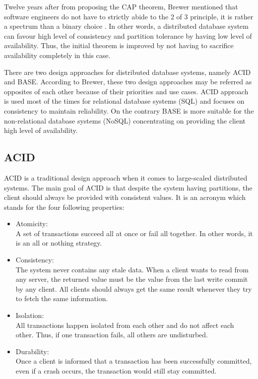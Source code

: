 Twelve years after from proposing the CAP theorem, Brewer mentioned that software engineers do not have to strictly abide to the 2 of 3 principle, it is rather a spectrum than a binary choice \cite{brewer2012cap}. In other words, a distributed database system can favour high level of consistency and partition tolerance by having low level of availability. Thus, the initial theorem is improved by not having to sacrifice availability completely in this case.

There are two design approaches for distributed database systems, namely ACID and BASE. According to Brewer, these two design approaches may be referred as opposites of each other\cite{brewer2012cap} because of their priorities and use cases. ACID approach is used most of the times for relational database systems (SQL) and focuses on consistency to maintain reliability. On the contrary BASE is more suitable for the non-relational database systems (NoSQL) concentrating on providing the client high level of availability\cite{brewer2000cap}.

\subsection{ACID}
\label{sec:background_acid}
ACID is a traditional design approach\cite{brewer2012cap} when it comes to large-scaled distributed systems. The main goal of ACID is that despite the system having partitions, the client should always be provided with consistent values. It is an acronym which stands for the four following properties:
\begin{itemize}
\item Atomicity:\\
A set of transactions succeed all at once or fail all together. In other words, it is an all or nothing strategy.
\item Consistency: \\
The system never contains any stale data. When a client wants to read from any server, the returned value must be the value from the last write commit by any client. All clients should always get the same result whenever they try to fetch the same information.
\item Isolation:\\
All transactions happen isolated from each other and do not affect each other. Thus, if one transaction fails, all others are undisturbed.
\item Durability:\\
Once a client is informed that a transaction has been successfully committed, even if a crash occurs, the transaction would still stay committed.
\end{itemize} 

